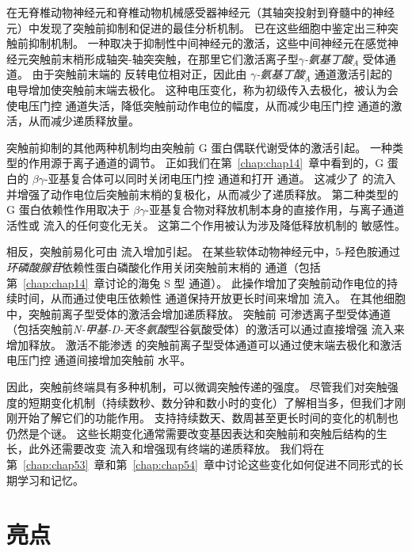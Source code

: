 在无脊椎动物神经元和脊椎动物机械感受器神经元（其轴突投射到脊髓中的神经元）中发现了突触前抑制和促进的最佳分析机制。
已在这些细胞中鉴定出三种突触前抑制机制。
一种取决于抑制性中间神经元的激活，这些中间神经元在感觉神经元突触前末梢形成轴突-轴突突触，在那里它们激活离子型\textit{$\gamma$-氨基丁酸}$_A$ 受体通道。
由于突触前末端的  反转电位相对正，因此由 \textit{$\gamma$-氨基丁酸}$_A$ 通道激活引起的  电导增加使突触前末端去极化。
这种电压变化，称为初级传入去极化，被认为会使电压门控  通道失活，降低突触前动作电位的幅度，从而减少电压门控  通道的激活，从而减少递质释放量。


突触前抑制的其他两种机制均由突触前 G 蛋白偶联代谢受体的激活引起。
一种类型的作用源于离子通道的调节。
正如我们在第~\ref{chap:chap14}~章中看到的，G 蛋白的 $\beta\gamma$-亚基复合体可以同时关闭电压门控  通道和打开  通道。
这减少了  的流入并增强了动作电位后突触前末梢的复极化，从而减少了递质释放。
第二种类型的 G 蛋白依赖性作用取决于 $\beta\gamma$-亚基复合物对释放机制本身的直接作用，与离子通道活性或  流入的任何变化无关。
这第二个作用被认为涉及降低释放机制的  敏感性。


相反，突触前易化可由  流入增加引起。
在某些软体动物神经元中，5-羟色胺通过\textit{环磷酸腺苷}依赖性蛋白磷酸化作用关闭突触前末梢的  通道（包括第~\ref{chap:chap14}~章讨论的海兔 S 型  通道）。
此操作增加了突触前动作电位的持续时间，从而通过使电压依赖性  通道保持开放更长时间来增加  流入。
在其他细胞中，突触前离子型受体的激活会增加递质释放。
突触前  可渗透离子型受体通道（包括突触前\textit{N-甲基-D-天冬氨酸}型谷氨酸受体）的激活可以通过直接增强  流入来增加释放。
激活不能渗透  的突触前离子型受体通道可以通过使末端去极化和激活电压门控  通道间接增加突触前  水平。


因此，突触前终端具有多种机制，可以微调突触传递的强度。
尽管我们对突触强度的短期变化机制（持续数秒、数分钟和数小时的变化）了解相当多，但我们才刚刚开始了解它们的功能作用。
支持持续数天、数周甚至更长时间的变化的机制也仍然是个谜。
这些长期变化通常需要改变基因表达和突触前和突触后结构的生长，此外还需要改变  流入和增强现有终端的递质释放。
我们将在第~\ref{chap:chap53}~章和第~\ref{chap:chap54}~章中讨论这些变化如何促进不同形式的长期学习和记忆。



\section{亮点}

